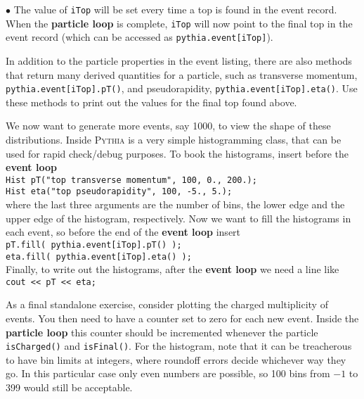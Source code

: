 \documentclass[12pt,a4paper]{article}
\newenvironment{Itemize}{\begin{list}{$\bullet$}%
{\setlength{\topsep}{0.4mm}\setlength{\partopsep}{0.4mm}%
\setlength{\itemsep}{0.4mm}\setlength{\parsep}{0.4mm}}}%
{\end{list}}
\begin{document}
\begin{Itemize}
The value of \texttt{iTop} will be set every time a top is found in the
event record. When the \textbf{particle loop} is complete, \texttt{iTop}
will now point to the final top in the event record (which can be accessed
as \texttt{pythia.event[iTop]}).
\item In addition to the particle properties in the event listing,  
there are also methods that return many derived quantities for a 
particle, such as transverse momentum, \texttt{pythia.event[iTop].pT()},
and pseudorapidity, \texttt{pythia.event[iTop].eta()}. Use these methods
to print out the values for the final top found above. 
\item We now want to generate more events, say 1000, to view the shape
of these distributions. Inside \textsc{Pythia} is a very simple
histogramming class, that can be used for rapid check/debug purposes. To
book the histograms, insert before the \textbf{event loop} \\
\hspace*{10mm}\texttt{Hist pT("top transverse momentum", 100, 0., 200.);}\\
\hspace*{10mm}\texttt{Hist eta("top pseudorapidity", 100, -5., 5.);}\\
where the last three arguments are the number of bins, the lower edge and
the upper edge of the histogram, respectively. Now we want to fill the
histograms in each event, so before the end of the \textbf{event loop}
insert \\
\hspace*{10mm}\texttt{pT.fill( pythia.event[iTop].pT() );}\\
\hspace*{10mm}\texttt{eta.fill( pythia.event[iTop].eta() );}\\
Finally, to write out the histograms, after the \textbf{event loop} we need
a line like
\hspace*{10mm}\texttt{cout << pT << eta;}
\item As a final standalone exercise, consider plotting the charged 
multiplicity of events. You then need to have a counter set to zero
for each new event. Inside the \textbf{particle loop} this counter should
be incremented whenever the particle \texttt{isCharged()} and
\texttt{isFinal()}. For the histogram, note that it can be treacherous to
have bin limits at integers, where roundoff errors decide whichever way
they go. In this particular case only even numbers are possible, so 100
bins from $-1$ to 399 would still be acceptable.
\end{Itemize}
\end{document}
